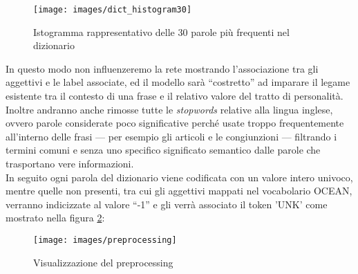 \begin{figure}[H]
	\centering
	{\texttt{[image: images/dict\_histogram30]}}
	\caption{Istogramma rappresentativo delle \num{30} parole più frequenti nel dizionario}
	\label{fig:Istrogramma del dizionario}
\end{figure}
 {\color{blue}In questo modo non influenzeremo la rete mostrando l'associazione tra gli aggettivi e le label associate, ed il modello sarà ``costretto'' ad imparare il legame esistente tra il contesto di una frase e il relativo valore del tratto di personalità.} \\
Inoltre andranno anche rimosse tutte le \emph{stopwords} relative alla lingua inglese, ovvero parole considerate poco significative perché usate troppo frequentemente all'interno delle frasi --- per esempio gli articoli e le congiunzioni --- filtrando i termini comuni e senza uno specifico significato semantico dalle parole che trasportano vere informazioni.\\
In seguito ogni parola del dizionario viene codificata con un valore intero univoco, mentre quelle non presenti, tra cui gli aggettivi mappati nel vocabolario OCEAN, verranno indicizzate al valore ``-1'' e gli verrà associato il token 'UNK' come mostrato nella figura \ref{fig:preprocessing}:
\begin{figure}[H]
	\centering
	{\texttt{[image: images/preprocessing]}}
	\caption{Visualizzazione del preprocessing}
	\label{fig:preprocessing}
\end{figure}

